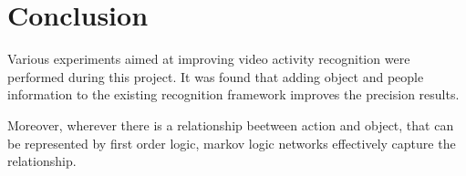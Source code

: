 \chapter{Conclusion}

\label{ch6_CONCLUSION}

Various experiments aimed at improving video activity recognition were performed during this project.
It was found that adding object and people information to the existing recognition framework
improves the precision results.

Moreover, wherever there is a relationship beetween action and object, that can be represented by first order logic,
markov logic networks effectively capture the relationship.
